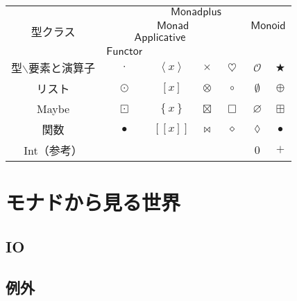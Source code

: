 \documentclass[twocolumn]{jsbook}
\def\[{[\![}
\def\]{]\!]}
\newcommand{\hsklTypeclass}[1]{\mathsf{#1}}
\newcommand{\hsklApplicative}{\hsklTypeclass{Applicative}}
\newcommand{\hsklFunctor}{\hsklTypeclass{Functor}}
\newcommand{\hsklMonad}{\hsklTypeclass{Monad}}
\newcommand{\hsklMonadplus}{\hsklTypeclass{Monadplus}}
\newcommand{\hsklMonoid}{\hsklTypeclass{Monoid}}
\newcommand{\anonymousparameter}{\lozenge}
\newcommand{\constantempty}{\emptyset}
\newcommand{\constantnothing}{\varnothing}
\newcommand{\binaryadd}{+}
\newcommand{\binarycompose}{\bullet}
\newcommand{\binaryfunctormap}{\cdot}
\newcommand{\binaryapplicativemap}{\times}
\newcommand{\binarymonadmap}{\heartsuit}%
\newcommand{\binarylistfunctormap}{\odot}
\newcommand{\binarylistapplicativemap}{\otimes}
\newcommand{\binarylistmonadmap}{\circ}%
\newcommand{\binarylistappend}{\oplus}
\newcommand{\binarymaybefunctormap}{\boxdot}
\newcommand{\binarymaybeapplicativemap}{\boxtimes}
\newcommand{\binarymaybemonadmap}{\Box}%
\newcommand{\binarymaybeappend}{\boxplus}
\newcommand{\binaryfunctionfunctormap}{\binarycompose}
\newcommand{\binaryfunctionapplicativemap}{\Join}%
\newcommand{\binaryfunctionmonadmap}{\diamond}%
\newcommand{\applicativetype}[1]{\left\langle#1\right\rangle}
\newcommand{\listtype}[1]{\left[#1\right]}
\newcommand{\maybetype}[1]{\left\{#1\right\}}
\newcommand{\functyontype}[1]{\[#1\]}
\newcommand{\mathbinaryop}{\bigstar}
\newcommand{\mathidentity}{\mathcal{O}}
\begin{document}
\begin{table*}
\begin{center}
\begin{tabular}{||c||c|c|c|c|c|c||}
\hline
\multirow{4}{*}{型クラス}
    &\multicolumn{6}{|c||}{$\hsklMonadplus$}\\
\cline{2-7}
\multirow{3}{*}{}
    &\multicolumn{4}{|c|}{$\hsklMonad$}
    &\multicolumn{2}{|c||}{$\hsklMonoid$}\\
\cline{2-4}
\multirow{2}{*}{}
    &\multicolumn{3}{|c|}{$\hsklApplicative$}
    &
    &\multicolumn{2}{|c||}{ }\\
\cline{2-2}
{ }
    &\multicolumn{1}{|c|}{$\hsklFunctor$}
    &\multicolumn{2}{|c|}{ }
    &
    &\multicolumn{2}{|c||}{ }\\
\hline\hline
型$\backslash$要素と演算子
    &$\binaryfunctormap$
    &$\applicativetype{x}$
    &$\binaryapplicativemap$
    &$\binarymonadmap$
    &$\mathidentity$
    &$\mathbinaryop$\\
\hline
リスト
    &$\binarylistfunctormap$
    &$\listtype{x}$
    &$\binarylistapplicativemap$
    &$\binarylistmonadmap$
    &$\constantempty$
    &$\binarylistappend$\\
\hline
Maybe
    &$\binarymaybefunctormap$
    &$\maybetype{x}$
    &$\binarymaybeapplicativemap$
    &$\binarymaybemonadmap$
    &$\constantnothing$
    &$\binarymaybeappend$\\
\hline
関数
    &$\binaryfunctionfunctormap$
    &$\functyontype{x}$
    &$\binaryfunctionapplicativemap$
    &$\binaryfunctionmonadmap$
    &$\anonymousparameter$
    &$\binarycompose$\\
\hline
Int（参考）
    &
    &
    &
    &
    &$0$
    &$\binaryadd$\\
\hline
\end{tabular}
\end{center}
\end{table*}

\part{モナドから見る世界}

\chapter{IO}

\chapter{例外}
\end{document}
